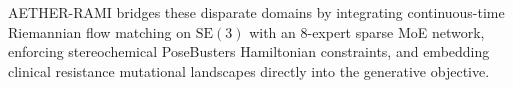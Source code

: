 AETHER-RAMI bridges these disparate domains by integrating continuous-time Riemannian flow matching on $\mathrm{SE}(3)$ with an 8-expert sparse MoE network, enforcing stereochemical PoseBusters Hamiltonian constraints, and embedding clinical resistance mutational landscapes directly into the generative objective.
